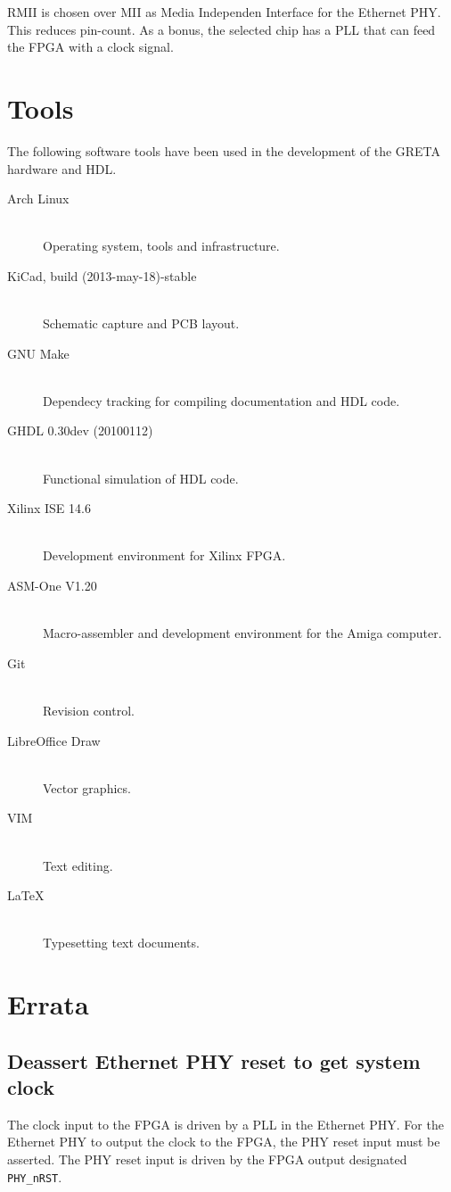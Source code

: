 \documentclass[a4paper]{report}
\begin{document}
RMII is chosen over MII as Media Independen Interface for the
Ethernet PHY. This reduces pin-count. As a bonus, the selected
chip has a PLL that can feed the FPGA with a clock signal.

\section{Tools}
The following software tools have been used in the development
of the GRETA hardware and HDL.
\begin{description}
  \item[Arch Linux] \hfill \\
  Operating system, tools and infrastructure.
  \item[KiCad, build (2013-may-18)-stable] \hfill \\
  Schematic capture and PCB layout.
  \item[GNU Make] \hfill \\
  Dependecy tracking for compiling documentation and HDL code.
  \item[GHDL 0.30dev (20100112)] \hfill \\
  Functional simulation of HDL code.
  \item[Xilinx ISE 14.6] \hfill \\
  Development environment for Xilinx FPGA.
  \item[ASM-One V1.20] \hfill \\
  Macro-assembler and development environment for the Amiga computer.
  \item[Git] \hfill \\
  Revision control.
  \item[LibreOffice Draw] \hfill \\
  Vector graphics.
  \item[VIM] \hfill \\
  Text editing.
  \item[\LaTeX] \hfill \\
  Typesetting text documents.
\end{description}

\section{Errata}
\subsection{Deassert Ethernet PHY reset to get system clock}
The clock input to the FPGA is driven by a PLL in the Ethernet PHY.
For the Ethernet PHY to output the clock to the FPGA, the PHY reset
input must be asserted. The PHY reset input is driven by the FPGA
output designated \texttt{PHY\_nRST}.
\end{document}
